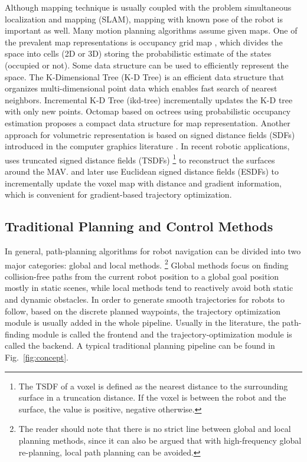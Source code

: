 \documentclass[letterpaper,journal,twoside]{IEEEtran}
\begin{document}
Although mapping technique is usually coupled with the problem 
simultaneous localization and mapping (SLAM), mapping with
known pose of the robot is important as well. 
Many motion planning algorithms assume given maps. 
One of the prevalent map representations is occupancy 
grid map \cite{elfes2013occupancy}, which divides the space
into cells (2D or 3D) storing the probabilistic estimate of the 
states (occupied or not).
Some data structure can be used to efficiently 
represent the space. 
The K-Dimensional Tree (K-D Tree) is an efficient data
structure that organizes multi-dimensional point data 
\cite{bentley1975multidimensional}
which enables fast search of nearest neighbors.
Incremental K-D Tree (ikd-tree) \cite{cai2021ikd} 
incrementally updates the K-D tree with only new points.
Octomap \cite{wurm2010octomap} based on octrees using 
probabilistic occupancy estimation proposes a compact 
data structure for map representation.
Another approach for volumetric representation is based on 
signed distance fields (SDFs) introduced in the computer
graphics literature \cite{curless1996volumetric}.
In recent robotic applications, \cite{lin2018autonomous} uses
truncated signed distance fields (TSDFs)
\footnote{The TSDF of a voxel is defined as the nearest 
distance to the surrounding surface in a truncation distance. 
If the voxel is between the robot and the surface, 
the value is positive, negative otherwise. }
to reconstruct the surfaces around the MAV. 
\cite{oleynikova2017voxblox} and later \cite{han2019fiesta}
use Euclidean signed distance fields (ESDFs) to incrementally
update the voxel map with distance and gradient information, 
which is convenient for gradient-based trajectory optimization.

\subsection{Traditional Planning and Control Methods}



In general, path-planning algorithms for robot navigation 
can be divided into two major categories: 
global and local methods.
\footnote{The reader should note that there is no strict 
line between global and local planning methods, since
it can also be argued that with high-frequency global
re-planning, local path planning can be avoided.}  
Global methods focus on finding collision-free paths from 
the current robot position to a global goal position mostly 
in static scenes, while local methods tend to reactively 
avoid both static and dynamic obstacles. 
In order to generate smooth trajectories for robots to 
follow, based on the discrete planned waypoints, the 
trajectory optimization module is usually added in the 
whole pipeline. 
Usually in the literature, the path-finding module 
is called the frontend and the 
trajectory-optimization module is called the backend. 
A typical traditional planning pipeline can be 
found in Fig.~\ref{fig:concept}.
\end{document}
